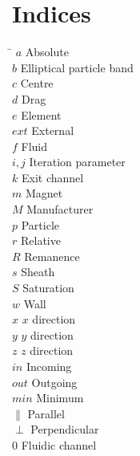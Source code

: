 \section*{Indices}
\begin{tabbing}
 \hspace*{1.6cm}  \= \kill
 $a$ \> Absolute \\[0.5ex] 
 $b$ \> Elliptical particle band \\[0.5ex]
 $c$ \> Centre \\[0.5ex] 
 $d$ \> Drag \\[0.5ex] 
 $e$ \> Element \\[0.5ex] 
 $ext$ \> External \\[0.5ex] 
 $f$ \> Fluid \\[0.5ex]
 $i,j$ \> Iteration parameter \\[0.5ex]
 $k$ \> Exit channel \\[0.5ex]
 $m$ \> Magnet \\[0.5ex]
 $M$ \> Manufacturer \\[0.5ex]
 $p$ \> Particle \\[0.5ex] 
 $r$ \> Relative \\[0.5ex] 
 $R$ \> Remanence \\[0.5ex] 
 $s$ \> Sheath \\[0.5ex]  
 $S$ \> Saturation \\[0.5ex]  
 $w$ \> Wall \\[0.5ex]  
 $x$ \> $x$ direction \\[0.5ex]  
 $y$ \> $y$ direction \\[0.5ex]  
 $z$ \> $z$ direction \\[0.5ex]  
 $in$ \> Incoming \\[0.5ex]
 $out$ \> Outgoing \\[0.5ex]    
 $min$ \> Minimum \\[0.5ex]
 $\parallel$ \> Parallel \\[0.5ex]  
 $\perp$ \> Perpendicular \\[0.5ex]  
 $0$ \> Fluidic channel 
\end{tabbing}


